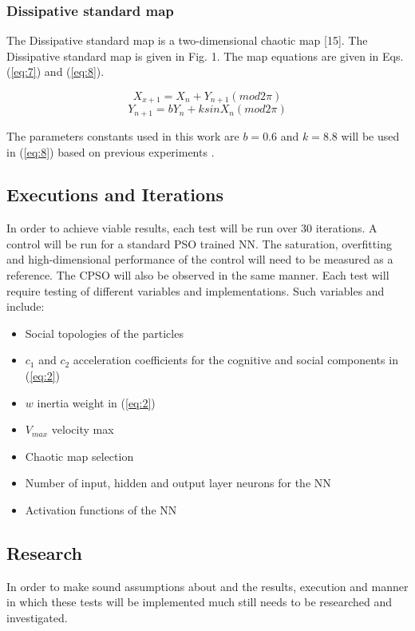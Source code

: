 \documentclass[conference]{IEEEtran}
\begin{document}
	\subsubsection{Dissipative standard map}

	The Dissipative standard map is a two-dimensional chaotic map [15]. The Dissipative standard map is given in
Fig. 1. The map equations are given in Eqs. (\ref{eq:7}) and (\ref{eq:8}).

	\begin{equation} \label{eq:7}
	X_{x+1} = X_n + Y_{n+1} (mod 2\pi)
	\end{equation}
	\begin{equation} \label{eq:8}
	Y_{n+1} = bY_n + k sin X_n (mod 2\pi)
	\end{equation}

	\noindent The parameters constants used in this work are $ b = 0.6 $ and $ k = 8.8 $ will be used in (\ref{eq:8}) based on previous experiments \cite{pluhacek:cpso-cprng-imp}.


	\subsection{Executions and Iterations}
	In order to achieve viable results, each test will be run over 30 iterations. A control will be run for a standard \ac{PSO} trained \ac{NN}. The saturation, overfitting and high-dimensional performance of the control will need to be measured as a reference. The \ac{CPSO} will also be observed in the same manner. Each test will require testing of different variables and implementations. Such variables and include:
	\begin{itemize}
		\item Social topologies of the particles
		\item $c_1$ and $c_2$ acceleration coefficients for the cognitive and social components in (\ref{eq:2})
		\item $w$ inertia weight in (\ref{eq:2})
		\item $ V_{max} $ velocity max
		\item Chaotic map selection
		\item Number of input, hidden and output layer neurons for the \ac{NN}
		\item Activation functions of the \ac{NN}
	\end{itemize}


	\subsection{Research}
	In order to make sound assumptions about and the results, execution and manner in which these tests will be implemented much still needs to be researched and investigated.
\end{document}
